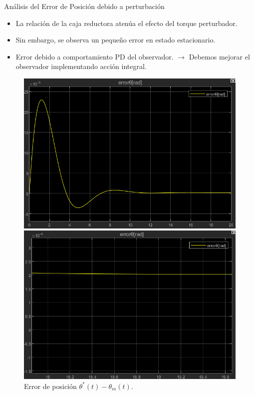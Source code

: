 \documentclass[12pt]{beamer}
\begin{document}
\begin{frame}{Análisis del Error de Posición debido a perturbación}
    \begin{itemize}
        \item La relación de la caja reductora atenúa el efecto del torque perturbador.
        \item Sin embargo, se observa un pequeño error en estado estacionario.
        \item Error debido a comportamiento PD del observador. $\rightarrow$ Debemos mejorar el observador implementando acción integral.
    \end{itemize}

    \begin{figure}
        \centering
        \begin{minipage}{0.48\textwidth}
            \centering
            \includegraphics[width=\textwidth]{Imagenes/ErrorPosicionPerturbacion.png}
            \caption{Error de posición \(\theta^*(t)-\theta_m(t)\).}
            \label{fig:ErrorPosicionPerturbacion}
        \end{minipage}
        \hfill
        \begin{minipage}{0.48\textwidth}
            \centering
            \includegraphics[width=\textwidth]{Imagenes/AcercamientoErrorPosicionPerturbacion.png}

\end{minipage}
\end{figure}
\end{frame}
\end{document}
